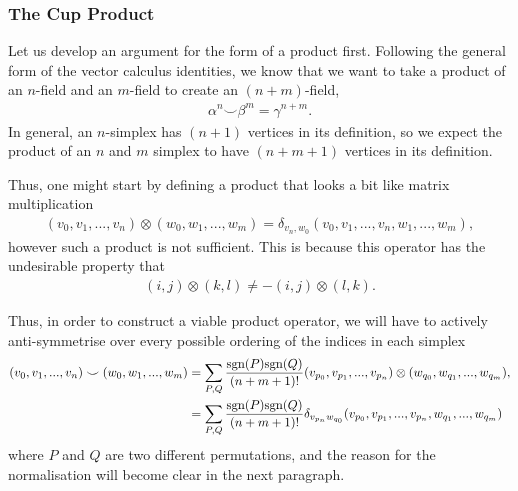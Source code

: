 \documentclass[11pt, oneside]{article} %
\numberwithin{equation}{section}
\begin{document}
\subsubsection{The Cup Product}

Let us develop an argument for the form of a product first. Following the general form of the vector calculus identities, we know that we want to take a product of an $n$-field and an $m$-field to create an $(n+m)$-field,
\begin{align}
    \alpha^n \smile \beta^m = \gamma ^{n+m}.
\end{align}
In general, an $n$-simplex has $(n+1)$ vertices in its definition, so we expect the product of an $n$ and $m$ simplex to have $(n+m+1)$ vertices in its definition. 

Thus, one might start by defining a product that looks a bit like matrix multiplication
\begin{align} \label{eqn:simplex_otimes}
    (v_0, v_1,  ... ,v_n)\otimes (w_0, w_1, ... ,w_m) = \delta_{v_n, w_0} (v_0, v_1, ... ,v_n, w_1, ... ,w_m),
\end{align}
however such a product is not sufficient. This is because this operator has the undesirable property that 
\begin{align}
    (i,j) \otimes (k,l) \neq - (i,j) \otimes (l,k).
\end{align}
\begin{incorrect}
    
Thus, in order to construct a viable product operator, we will have to actively anti-symmetrise over every possible ordering of the indices in each simplex
\begin{align}\label{eqn:simplex_cup_product}
    (v_0, v_1, ... ,v_n) \smile (w_0, w_1, ... ,w_m) 
    &= 
    \sum_{P,Q} 
    \frac{\textup{sgn}(P)\textup{sgn}(Q) }{(n+m+1)!}
    (v_{p_0}, v_{p_1}, ... ,v_{p_n}) 
    \otimes 
    (w_{q_0}, w_{q_1}, ... ,w_{q_m}),\\
    & = \sum_{P,Q} 
    \frac{\textup{sgn}(P)\textup{sgn}(Q) }{(n+m+1)!}
    \delta_{v_{p_n}w_{q_0}}
    (v_{p_0}, v_{p_1}, ... ,v_{p_n}, w_{q_1}, ... ,w_{q_m})
\end{align}
where $P$ and $Q$ are two different permutations, and the reason for the normalisation will become clear in the next paragraph. 
\end{incorrect}
\end{document}
